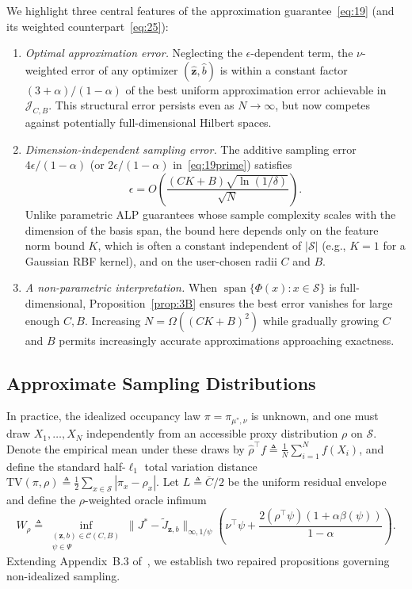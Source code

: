 \documentclass[11pt,letterpaper]{article}
\newcommand{\Jclass}{\mathcal{J}_{C,B}}
\newcommand{\Cbar}{\overline{C}}
\newcommand{\occ}{\pi_{\mu^*,\nu}}
\newcommand{\TV}{\mathrm{TV}}
\newcommand{\norm}[1]{\lVert #1\rVert}
\newcommand{\defeq}{\triangleq}
\theoremstyle{definition}
\begin{document}
We highlight three central features of the approximation guarantee~\eqref{eq:19} (and its weighted counterpart~\eqref{eq:25}):
\begin{enumerate}[leftmargin=2em,itemsep=3pt]
  \item \emph{Optimal approximation error.} Neglecting the $\epsilon$-dependent term, the $\nu$-weighted error of any optimizer $(\hat{\mathbf{z}},\hat{b})$ is within a constant factor $(3+\alpha)/(1-\alpha)$ of the best uniform approximation error achievable in $\Jclass$. This structural error persists even as $N\to\infty$, but now competes against potentially full-dimensional Hilbert spaces.
  \item \emph{Dimension-independent sampling error.} The additive sampling error $4\epsilon/(1-\alpha)$ (or $2\epsilon/(1-\alpha)$ in~\eqref{eq:19prime}) satisfies
  \[
   \epsilon = O\!\left(\frac{(CK + B)\sqrt{\ln(1/\delta)}}{\sqrt{N}}\right).
  \]
  Unlike parametric ALP guarantees whose sample complexity scales with the dimension of the basis span, the bound here depends only on the feature norm bound $K$, which is often a constant independent of $|\mathcal{S}|$ (e.g., $K = 1$ for a Gaussian RBF kernel), and on the user-chosen radii $C$ and $B$.
  \item \emph{A non-parametric interpretation.} When $\operatorname{span}\{\Phi(x):x\in\mathcal{S}\}$ is full-dimensional, Proposition~\ref{prop:3B} ensures the best error vanishes for large enough $C,B$. Increasing $N = \Omega((CK+B)^2)$ while gradually growing $C$ and $B$ permits increasingly accurate approximations approaching exactness.
\end{enumerate}

\subsection{Approximate Sampling Distributions}
\label{sec:samplinglaw}

In practice, the idealized occupancy law $\pi = \occ$ is unknown, and one must draw $X_1,\ldots,X_N$ independently from an accessible proxy distribution $\rho$ on $\mathcal{S}$. Denote the empirical mean under these draws by $\hat{\rho}^\top f \defeq \frac{1}{N}\sum_{i=1}^N f(X_i)$, and define the standard half-$\ell_1$ total variation distance $\TV(\pi,\rho) \defeq \frac{1}{2}\sum_{x\in\mathcal{S}} |\pi_x - \rho_x|$. Let $L \defeq \Cbar/2$ be the uniform residual envelope and define the $\rho$-weighted oracle infimum
\[
 W_\rho \defeq \inf_{\substack{(\mathbf{z},b)\in\mathcal{C}(C,B)\\ \psi\in\Psi}}
 \norm{J^* - \tilde{J}_{\mathbf{z},b}}_{\infty,1/\psi}
 \left(\nu^\top\psi + \frac{2(\rho^\top\psi)(1+\alpha\beta(\psi))}{1-\alpha}\right).
\]
Extending Appendix~B.3 of~\cite{BFMZ22}, we establish two repaired propositions governing non-idealized sampling.
\end{document}
